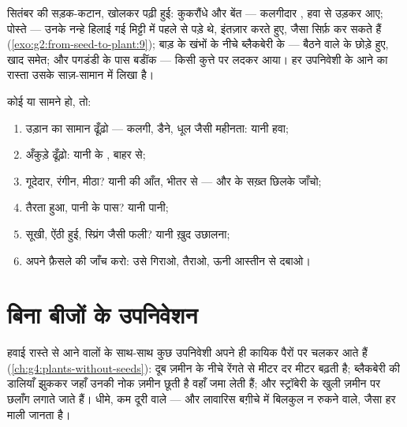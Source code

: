 \begin{example}[सड़क किनारे को पढ़ना]\label{ex:g6:how-plants-spread:roadside}
सितंबर की सड़क-कटान, खोलकर पढ़ी हुई: कुकरौंधे और बेंत --- कलगीदार ,
हवा से उड़कर आए; पोस्ते --- उनके नन्हे  हिलाई गई मिट्टी में पहले से
पड़े थे, इंतज़ार करते हुए, जैसा सिर्फ़  कर सकते हैं
(\cref{exo:g2:from-seed-to-plant:9}); बाड़ के खंभों के नीचे ब्लैकबेरी
के  --- बैठने वाले  के छोड़े हुए, खाद समेत; और पगडंडी के
पास बर्डॉक --- किसी कुत्ते पर लदकर आया। हर उपनिवेशी के आने का रास्ता
उसके साज़-सामान में लिखा है।
\end{example}

\begin{method}[फल से ढोने वाले का नाम बूझना]\label{met:g6:how-plants-spread:name}
कोई  या  सामने हो, तो:
\begin{enumerate}
  \item उड़ान का सामान ढूँढ़ो --- कलगी, डैने, धूल जैसी महीनता: यानी
        हवा;
  \item अँकुड़े ढूँढ़ो: यानी  के , बाहर से;
  \item गूदेदार, रंगीन, मीठा? यानी  की आँत, भीतर से --- और 
        के सख़्त छिलके जाँचो;
  \item तैरता हुआ, पानी के पास? यानी पानी;
  \item सूखी, ऐंठी हुई, स्प्रिंग जैसी फली? यानी ख़ुद उछालना;
  \item अपने फ़ैसले की जाँच करो: उसे गिराओ, तैराओ, ऊनी आस्तीन से
        दबाओ।
\end{enumerate}
\end{method}

\section{बिना बीजों के उपनिवेशन}

\begin{example}[ज़मीनी बढ़त]\label{ex:g6:how-plants-spread:vegetative}
हवाई रास्ते से आने वालों के साथ-साथ कुछ उपनिवेशी अपने ही कायिक पैरों पर
चलकर आते हैं (\cref{ch:g4:plants-without-seeds}): दूब ज़मीन के नीचे
रेंगते  से मीटर दर मीटर बढ़ती है; ब्लैकबेरी की डालियाँ झुककर जहाँ
उनकी नोक ज़मीन छूती है वहाँ  जमा लेती हैं; और स्ट्रॉबेरी के
 खुली ज़मीन पर छलाँग लगाते जाते हैं। धीमे, कम दूरी वाले --- और
लावारिस बग़ीचे में बिलकुल न रुकने वाले, जैसा हर माली जानता है।
\end{example}

